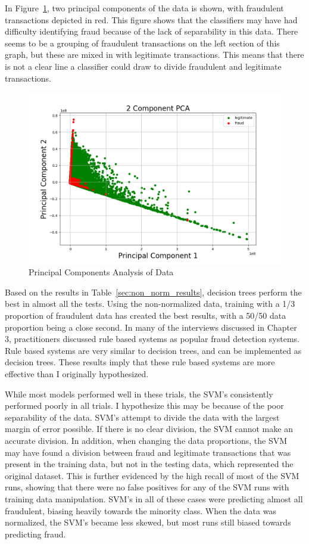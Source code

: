 \documentclass[midd]{thesis}
\begin{document}
In Figure~\ref{fig:data1}, two principal components of the data is shown, with fraudulent transactions depicted in red. This figure shows that the classifiers may have had difficulty identifying fraud because of the lack of separability in this data. There seems to be a grouping of fraudulent transactions on the left section of this graph, but these are mixed in with legitimate transactions. This means that there is not a clear line a classifier could draw to divide fraudulent and legitimate transactions.

\begin{figure} \centering
  \includegraphics[scale=.6]{pca2.png}
  \caption{Principal Components Analysis of Data}
  \label{fig:data1}
\end{figure}

Based on the results in Table~\ref{sec:non_norm_results}, decision trees perform the best in almost all the tests. Using the non-normalized data, training with a 1/3 proportion of fraudulent data has created the best results, with a 50/50 data proportion being a close second. In many of the interviews discussed in Chapter 3, practitioners discussed rule based systems as popular fraud detection systems. Rule based systems are very similar to decision trees, and can be implemented as decision trees. These results imply that these rule based systems are more effective than I originally hypothesized. 

While most models performed well in these trials, the SVM's consistently performed poorly in all trials. I hypothesize this may be because of the poor separability of the data. SVM's attempt to divide the data with the largest margin of error possible. If there is no clear division, the SVM cannot make an accurate division. In addition, when changing the data proportions, the SVM may have found a division between fraud and legitimate transactions that was present in the training data, but not in the testing data, which represented the original dataset. This is further evidenced by the high recall of most of the SVM runs, showing that there were no false positives for any of the SVM runs with training data manipulation. SVM's in all of these cases were predicting almost all fraudulent, biasing heavily towards the minority class. When the data was normalized, the SVM's became less skewed, but most runs still biased towards predicting fraud.
\end{document}
